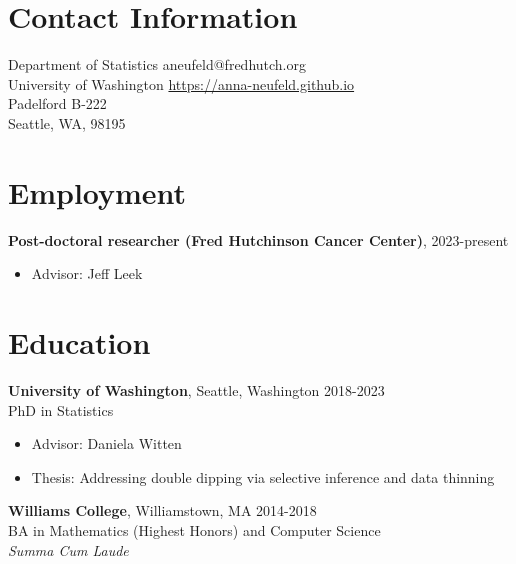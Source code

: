 \documentclass[margin, 10pt]{res} %
\begin{document}
\begin{resume}

 

\section{Contact Information}
Department of Statistics \hfill  aneufeld@fredhutch.org\\
University of Washington \hfill \href{https://anna-neufeld.github.io}{https://anna-neufeld.github.io} \\
Padelford B-222  \hfill \\
Seattle, WA, 98195



\section{Employment} 
{\textbf{Post-doctoral researcher (Fred Hutchinson Cancer Center)},} \hfill 2023-present
\begin{itemize}
\item Advisor: Jeff Leek
\end{itemize}

\section{Education} 

{\textbf{University of Washington},} Seattle, Washington \hfill 2018-2023 \\
PhD in Statistics
\begin{itemize}
\item Advisor: Daniela Witten
\item Thesis: Addressing double dipping via selective inference and data thinning 
\end{itemize}

{\textbf{Williams College}}, Williamstown, MA \hfill 2014-2018  \\
BA in Mathematics (Highest Honors) and Computer Science \\ 
\textit{Summa Cum Laude}%
 

\end{resume}
\end{document}
